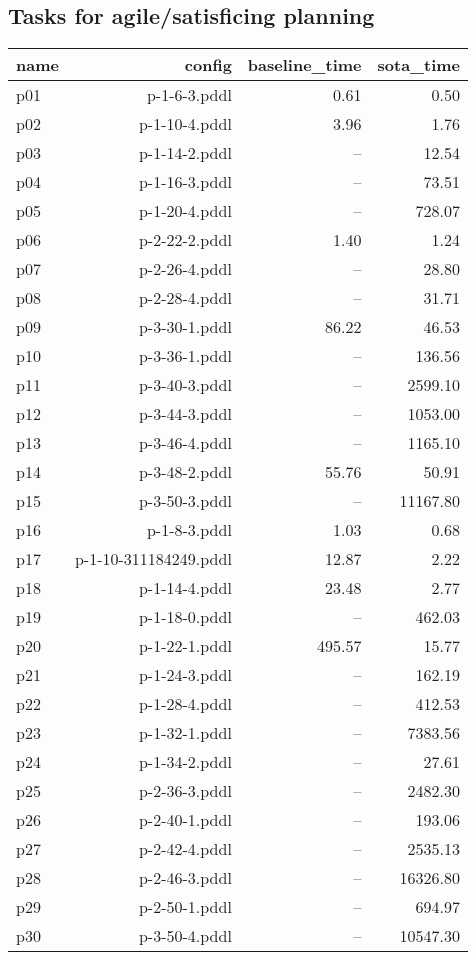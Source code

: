 \documentclass{article}
\begin{document}
                    \subsection*{Tasks for agile/satisficing planning}
                    
                            \begin{center}
                            \scriptsize
                            \begin{tabular}{@{}l|r|r|r@{}}
                            name & config & baseline\_time & sota\_time\\\midrule
                              p01& p-1-6-3.pddl&0.61&0.50\\
  p02& p-1-10-4.pddl&3.96&1.76\\
  p03& p-1-14-2.pddl&--&12.54\\
  p04& p-1-16-3.pddl&--&73.51\\
  p05& p-1-20-4.pddl&--&728.07\\
  p06& p-2-22-2.pddl&1.40&1.24\\
  p07& p-2-26-4.pddl&--&28.80\\
  p08& p-2-28-4.pddl&--&31.71\\
  p09& p-3-30-1.pddl&86.22&46.53\\
  p10& p-3-36-1.pddl&--&136.56\\
  p11& p-3-40-3.pddl&--&2599.10\\
  p12& p-3-44-3.pddl&--&1053.00\\
  p13& p-3-46-4.pddl&--&1165.10\\
  p14& p-3-48-2.pddl&55.76&50.91\\
  p15& p-3-50-3.pddl&--&11167.80\\
  p16& p-1-8-3.pddl&1.03&0.68\\
  p17& p-1-10-311184249.pddl&12.87&2.22\\
  p18& p-1-14-4.pddl&23.48&2.77\\
  p19& p-1-18-0.pddl&--&462.03\\
  p20& p-1-22-1.pddl&495.57&15.77\\
  p21& p-1-24-3.pddl&--&162.19\\
  p22& p-1-28-4.pddl&--&412.53\\
  p23& p-1-32-1.pddl&--&7383.56\\
  p24& p-1-34-2.pddl&--&27.61\\
  p25& p-2-36-3.pddl&--&2482.30\\
  p26& p-2-40-1.pddl&--&193.06\\
  p27& p-2-42-4.pddl&--&2535.13\\
  p28& p-2-46-3.pddl&--&16326.80\\
  p29& p-2-50-1.pddl&--&694.97\\
  p30& p-3-50-4.pddl&--&10547.30
                            \end{tabular}
                            \end{center}
                    
\end{document}
